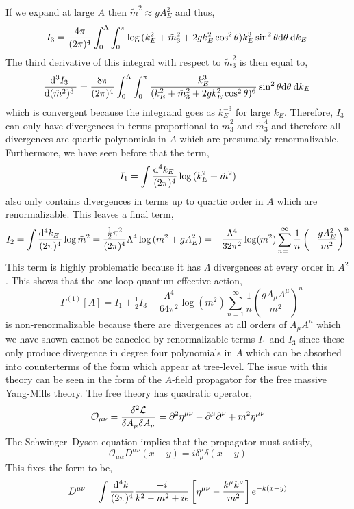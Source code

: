 \documentclass[12pt]{article}
\begin{document}
If we expand at large $A$ then $\tilde{m}^2 \approx g A_E^2$ and thus,
\[ I_3 = \frac{4 \pi}{(2 \pi)^4} \int_0^{\Lambda} \int_0^{\pi} \log{(k_E^2 + \tilde{m}_3^2 + 2 g k_E^2 \cos^2{\theta})}  k_E^3 \sin^2{\theta} \mathrm{d}\theta \: \mathrm{d}k_E \:  \]
The third derivative of this integral with respect to $\tilde{m}_3^2$ is then equal to,
\[ \frac{\mathrm{d}^{3} I_3 \:}{\mathrm{d}(\tilde{m}^2)^{3} \:} = \frac{8 \pi}{(2 \pi)^4} \int_0^{\Lambda} \int_0^\pi \frac{k_E^3}{(k_E^2 + \tilde{m}_3^2 + 2 g k_E^2 \cos^2{\theta})^6} \sin^2{\theta} \mathrm{d}\theta \: \mathrm{d}k_E \: \]
which is convergent because the integrand goes as $k_E^{-3}$ for large $k_E$. Therefore, $I_3$ can only have divergences in terms proportional to $\tilde{m}_3^2$ and $\tilde{m}_3^4$ and therefore all divergences are quartic polynomials in $A$ which are presumably renormalizable. Furthermore, we have seen before that the term,
\[ I_1 = \int \frac{\mathrm{d}^{4} k_E \:}{(2 \pi)^4} \log{(k_E^2 + \tilde{m}^2)} \]
also only contains divergences in terms up to quartic order in $A$ which are renormalizable. This leaves a final term,
\begin{align*}
I_2 = \int \frac{\mathrm{d}^{4} k_E \:}{(2 \pi)^4} \log{\tilde{m}^2} = \frac{\tfrac{1}{2} \pi^2}{(2 \pi)^4} \Lambda^4 \log{(m^2 + g A_E^2)} = - \frac{\Lambda^4}{32 \pi^2} \log(m^2) \sum_{n = 1}^{\infty} \frac{1}{n} \left( - \frac{g A_E^2}{m^2} \right)^n
\end{align*} 
This term is highly problematic because it has $\Lambda$ divergences at every order in $A^2$. This shows that the one-loop quantum effective action,
\[ - \Gamma^{(1)}[A] = I_1 + \tfrac{1}{2} I_3 - \frac{\Lambda^4}{64 \pi^2} \log(m^2) \sum_{n = 1}^{\infty} \frac{1}{n} \left( \frac{g A_\mu A^\mu}{m^2} \right)^n \]
is non-renormalizable because there are divergences at all orders of $A_\mu A^\mu$ which we have shown cannot be canceled by renormalizable terms $I_1$ and $I_3$ since these only produce divergence in degree four polynomials in $A$ which can be absorbed into counterterms of the form which appear at tree-level. The issue with this theory can be seen in the form of the $A$-field propagator for the free massive Yang-Mills theory. The free theory has quadratic operator,
\[ \mathcal{O}_{\mu \nu} = \frac{\delta^2 \mathcal{L}}{\delta A_\mu \delta A_{\nu}} = \partial^2 \eta^{\mu \nu} - \partial^\mu \partial^\nu + m^2 \eta^{\mu \nu} \] 
The Schwinger–Dyson equation implies that the propagator must satisfy,
\[ \mathcal{O}_{\mu \alpha} D^{\alpha \nu}(x - y) = i \delta_{\mu}^{\nu} \delta(x - y) \]
This fixes the form to be,
\[ D^{\mu \nu} = \int \frac{\mathrm{d}^{4} k \:}{(2 \pi)^4} \frac{ - i }{k^2 - m^2 + i \epsilon} \left[ \eta^{\mu \nu} - \frac{ k^\mu k^\nu }{m^2} \right] e^{ - k(x - y)} \]
\end{document}
